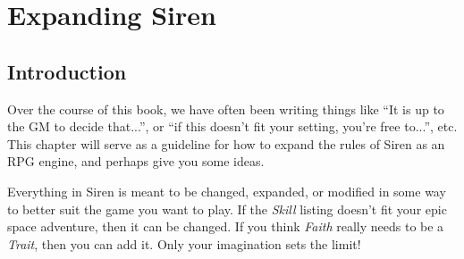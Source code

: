 \chapter{Expanding Siren}
\section{Introduction}
Over the course of this book, we have often been writing things like ``It is up to the GM to decide that...'', or ``if this doesn't fit your setting, you're free to...'', etc.
This chapter will serve as a guideline for how to expand the rules of Siren as an RPG engine, and perhaps give you some ideas.

Everything in Siren is meant to be changed, expanded, or modified in some way to better suit the game you want to play.
If the \textit{Skill} listing doesn't fit your epic space adventure, then it can be changed.
If you think \textit{Faith} really needs to be a \textit{Trait}, then you can add it.
Only your imagination sets the limit!